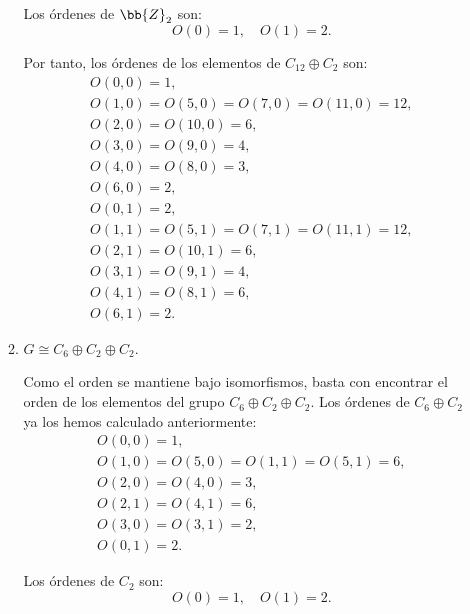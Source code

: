 \begin{ejercicio}
\begin{enumerate}
\begin{enumerate}
            Los órdenes de $\bb{Z}_2$ son:
            \begin{equation*}
                O(0) = 1, \quad O(1) = 2.
            \end{equation*}

            Por tanto, los órdenes de los elementos de $C_{12} \oplus C_2$ son:
            \begin{gather*}
                O(0, 0) = 1, \\
                O(1, 0) = O(5, 0) = O(7, 0) = O(11, 0) = 12, \\
                O(2, 0) = O(10, 0) = 6, \\
                O(3, 0) = O(9, 0) = 4, \\
                O(4, 0) = O(8, 0) = 3, \\
                O(6, 0) = 2, \\
                O(0, 1) = 2, \\
                O(1, 1) = O(5, 1) = O(7, 1) = O(11, 1) = 12, \\
                O(2, 1) = O(10, 1) = 6, \\
                O(3, 1) = O(9, 1) = 4, \\
                O(4, 1) = O(8, 1) = 6, \\
                O(6, 1) = 2.
            \end{gather*}
            
            \item $G \cong C_6 \oplus C_2 \oplus C_2$.
            
            Como el orden se mantiene bajo isomorfismos, basta con encontrar el orden de los elementos del grupo $C_6\oplus C_2 \oplus C_2$. Los órdenes de $C_6\oplus C_2$ ya los hemos calculado anteriormente:
            \begin{gather*}
                O(0, 0) = 1, \\
                O(1, 0) = O(5, 0) = O(1, 1) = O(5, 1) = 6, \\
                O(2, 0) = O(4, 0) = 3, \\
                O(2, 1) = O(4, 1) = 6, \\
                O(3, 0) = O(3, 1) = 2, \\
                O(0, 1) = 2.
            \end{gather*}

            Los órdenes de $C_2$ son:
            \begin{equation*}
                O(0) = 1, \quad O(1) = 2.
            \end{equation*}


\end{enumerate}
\end{enumerate}
\end{ejercicio}
